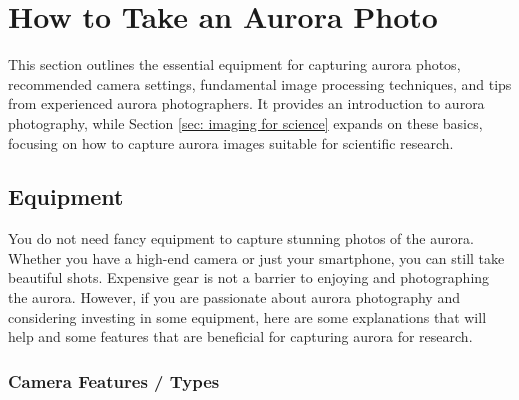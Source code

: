 \documentclass{article}
\newcommand{\contributed}[1]{%
    \par\noindent
    \begingroup
    \setlength{\leftskip}{1em}%
    \itshape
    Contributors: #1
    \par
    \endgroup
    \vspace{0.5em}
}
\begin{document}
\section{How to Take an Aurora Photo} 
This section outlines the essential equipment for capturing aurora photos, recommended camera settings, fundamental image processing techniques, and tips from experienced aurora photographers. It provides an introduction to aurora photography, while Section \ref{sec: imaging for science} expands on these basics, focusing on how to capture aurora images suitable for scientific research.


\subsection{Equipment}

You do not need fancy equipment to capture stunning photos of the aurora. Whether you have a high-end camera or just your smartphone, you can still take beautiful shots. Expensive gear is not a barrier to enjoying and photographing the aurora. However, if you are passionate about aurora photography and considering investing in some equipment, here are some explanations that will help and some features that are beneficial for capturing aurora for research.

\subsubsection{Camera Features / Types}
\end{document}
